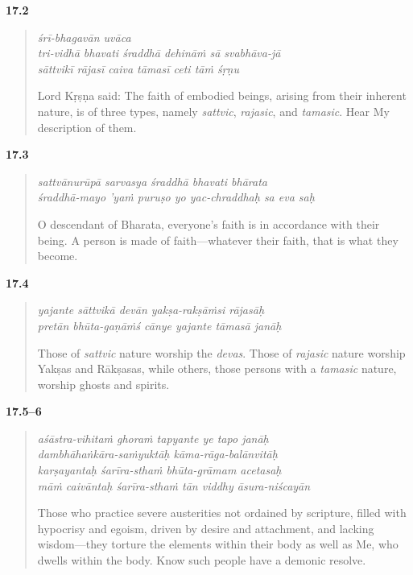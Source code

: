 \par\noindent\textbf{17.2}\par
\begin{verse}
\textit{śrī-bhagavān uvāca} \\
\textit{tri-vidhā bhavati śraddhā dehināṁ sā svabhāva-jā} \\
\textit{sāttvikī rājasī caiva tāmasī ceti tāṁ śṛṇu}

\noindent Lord Kṛṣṇa said: The faith of embodied beings, arising from their inherent nature, is of three types, namely \textit{sattvic}, \textit{rajasic}, and \textit{tamasic}. Hear My description of them.
\end{verse}
\par



\par\noindent\textbf{17.3}\par
\begin{verse}
\textit{sattvānurūpā sarvasya śraddhā bhavati bhārata} \\
\textit{śraddhā-mayo ’yaṁ puruṣo yo yac-chraddhaḥ sa eva saḥ}

\noindent O descendant of Bharata, everyone's faith is in accordance with their being. A person is made of faith---whatever their faith, that is what they become.
\end{verse}
\par



\par\noindent\textbf{17.4}\par
\begin{verse}
\textit{yajante sāttvikā devān yakṣa-rakṣāṁsi rājasāḥ} \\
\textit{pretān bhūta-gaṇāṁś cānye yajante tāmasā janāḥ}

\noindent Those of \textit{sattvic} nature worship the \textit{devas}. Those of \textit{rajasic} nature worship Yakṣas and Rākṣasas, while others, those persons with a \textit{tamasic} nature, worship ghosts and spirits.
\end{verse}
\par



\par\noindent\textbf{17.5–6}\par
\begin{verse}
\textit{aśāstra-vihitaṁ ghoraṁ tapyante ye tapo janāḥ} \\
\textit{dambhāhaṅkāra-saṁyuktāḥ kāma-rāga-balānvitāḥ} \\
\textit{karṣayantaḥ śarīra-sthaṁ bhūta-grāmam acetasaḥ} \\
\textit{māṁ caivāntaḥ śarīra-sthaṁ tān viddhy āsura-niścayān}

\noindent Those who practice severe austerities not ordained by scripture, filled with hypocrisy and egoism, driven by desire and attachment, and lacking wisdom---they torture the elements within their body as well as Me, who dwells within the body. Know such people have a demonic resolve.
\end{verse}
\par


